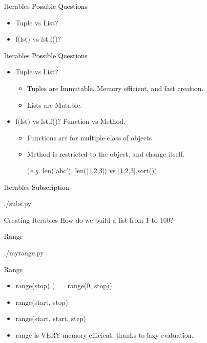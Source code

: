 \documentclass{beamer}
\begin{document}
\begin{frame}{Iterables}
  \textcolor{black}{\large{Possible Questions}}
  \begin{itemize}
    \item Tuple vs List?
    \item f(lst) vs lst.f()?
  \end{itemize}
\end{frame}

\begin{frame}{Iterables}
  \textcolor{black}{\large{Possible Questions}}
  \begin{itemize}
    \item Tuple vs List?
      \begin{itemize}
        \item Tuples are Immutable. Memory efficient, and fast creation.
        \item Lists are Mutable.
      \end{itemize}

    \item f(lst) vs lst.f()?
      Function vs Method. 
      \begin{itemize}
        \item Functions are for multiple class of objects
        \item Method is restricted to the object, and change itself. 
          
          (\textit{e.g.} len('abc'), len([1,2,3]) vs [1,2,3].sort())
      \end{itemize}
  \end{itemize}
\end{frame}

\begin{frame}{Iterables}
  \textcolor{black}{\large{Subscription}}
  \begin{lstinputlisting}
    {./subs.py}
  \end{lstinputlisting}
\end{frame}

\begin{frame}{Creating Iterables}
  How do we build a list from 1 to 100?
\end{frame}

\begin{frame}{Range}
  \begin{lstinputlisting}
    {./myrange.py}
  \end{lstinputlisting}
\end{frame}

\begin{frame}{Range}
  \begin{itemize}
    \item range(stop) (== range(0, stop))
    \item range(start, stop)
    \item range(start, start, step)
    \item range is \alert{VERY} memory efficient, thanks to lazy evaluation.
  \end{itemize}
\end{frame}
\end{document}
